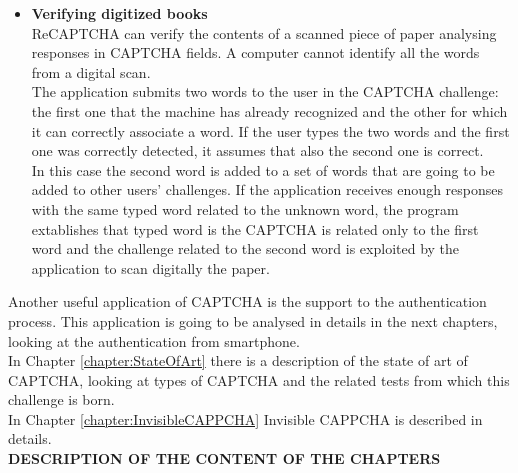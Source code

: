 \begin{itemize}
\item{\textbf{Verifying digitized books}\\
ReCAPTCHA can verify the contents of a scanned piece of paper analysing responses in CAPTCHA fields. A computer cannot identify all the words from a digital scan.\\
The application submits two words to the user in the CAPTCHA challenge: the first one that the machine has already recognized and the other for which it can correctly associate a word. If the user types the two words and the first one was correctly detected, it assumes that also the second one is correct.\\
In this case the second word is added to a set of words that are going to be added to other users' challenges. If the application receives enough responses with the same typed word related to the unknown word, the program extablishes that typed word is the CAPTCHA is related only to the first word and the challenge related to the second word is exploited by the application to scan digitally the paper.
}
\end{itemize}
Another useful application of CAPTCHA is the support to the authentication process. This application is going to be analysed in details in the next chapters, looking at the authentication from smartphone.\\
In Chapter \ref{chapter:StateOfArt} there is a description of the state of art of CAPTCHA, looking at types of CAPTCHA and the related tests from which this challenge is born.\\
In Chapter \ref{chapter:InvisibleCAPPCHA} Invisible CAPPCHA is described in details.\\
\textbf{DESCRIPTION OF THE CONTENT OF THE CHAPTERS}